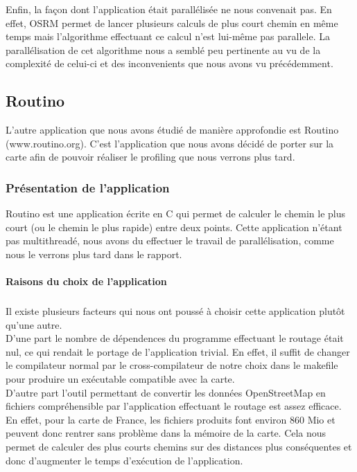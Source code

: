 Enfin, la façon dont l'application était parallélisée ne nous convenait pas. En 
effet, OSRM permet de lancer plusieurs calculs de plus court chemin en même 
temps mais l'algorithme effectuant ce calcul n'est lui-même pas parallele. 
La parallélisation de cet algorithme nous a semblé peu pertinente au vu de la 
complexité de celui-ci et des inconvenients que nous avons vu précédemment.

\subsection{Routino}

L'autre application que nous avons étudié de manière approfondie est Routino 
(www.routino.org). C'est l'application que nous avons décidé de porter sur la 
carte afin de pouvoir réaliser le profiling que nous verrons plus tard.

\subsubsection{Présentation de l'application}

Routino est une application écrite en C qui permet de calculer le chemin le 
plus court (ou le chemin le plus rapide) entre deux points. Cette application 
n'étant pas multithreadé, nous avons du effectuer le travail de parallélisation,
comme nous le verrons plus tard dans le rapport.

\paragraph{Raisons du choix de l'application}
\subparagraph{}

Il existe plusieurs facteurs qui nous ont poussé à choisir cette application 
plutôt qu'une autre. \\

D'une part le nombre de dépendences du programme effectuant le routage 
était nul, ce qui rendait le portage de l'application trivial. En effet, il 
suffit de changer le compilateur normal par le cross-compilateur de notre choix 
dans le makefile pour produire un exécutable compatible avec la carte. \\

D'autre part l'outil permettant de convertir les données OpenStreetMap en 
fichiers compréhensible par l'application effectuant le routage est assez 
efficace. En effet, pour la carte de France, les fichiers produits font environ 
860 Mio et peuvent donc rentrer sans problème dans la mémoire de la carte. Cela 
nous permet de calculer des plus courts chemins sur des distances plus 
conséquentes et donc d'augmenter le temps d'exécution de l'application. \\

